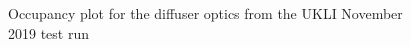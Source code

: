 \begin{figure}
\end{figure}


\begin{figure}
    \centering
    
    \caption{Occupancy plot for the diffuser optics from the UKLI November 2019 test run} \label{fig:occupancy_diffuser} 
    

\end{figure}
